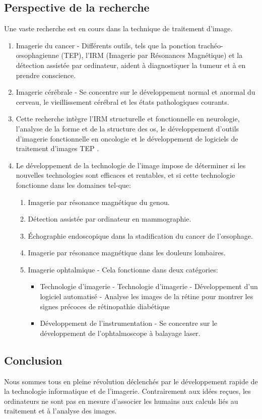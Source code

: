 \documentclass[12pt]{article}
\begin{document}
\subsection{Perspective de la recherche}
Une vaste recherche est en cours dans la technique de traitement d'image.
\begin{enumerate}
	\item Imagerie du cancer - Différents outils, tels que la ponction trachéo-œsophagienne (TEP), l'IRM (Imagerie par Résonances Magnétique) et la détection assistée par ordinateur, aident à diagnostiquer la tumeur et à en prendre conscience.
	\item Imagerie cérébrale - Se concentre sur le développement normal et anormal du cerveau, le vieillissement cérébral et les états pathologiques courants.
	\item Cette recherche intègre l'IRM structurelle et fonctionnelle en neurologie, l'analyse de la forme et de la structure des os, le développement d'outils d'imagerie fonctionnelle en oncologie et le développement de logiciels de traitement d'images TEP \cite{25}.
	\item Le développement de la technologie de l'image impose de déterminer si les nouvelles technologies sont efficaces et rentables, et si cette technologie fonctionne dans les domaines tel-que:
	\begin{enumerate}
		\item Imagerie par résonance magnétique du genou.
		\item Détection assistée par ordinateur en mammographie.
		\item Échographie endoscopique dans la stadification du cancer de l'œsophage.
		\item Imagerie par résonance magnétique dans les douleurs lombaires.
		\item Imagerie ophtalmique - Cela fonctionne dans deux catégories:
		\begin{itemize}
			\item Technologie d'imagerie - Technologie d'imagerie - Développement d'un logiciel automatisé - Analyse les images de la rétine pour montrer les signes précoces de rétinopathie diabétique
			\item Développement de l'instrumentation - Se concentre sur le développement de l'ophtalmoscope à balayage laser.
		\end{itemize}
	\end{enumerate}
\end{enumerate}

\subsection{Conclusion}
Nous sommes tous en pleine révolution déclenchés par le développement rapide de la technologie informatique et de l'imagerie. Contrairement aux idées reçues, les ordinateurs ne sont pas en mesure d’associer les humains aux calculs liés au traitement et à l’analyse des images.
\end{document}
